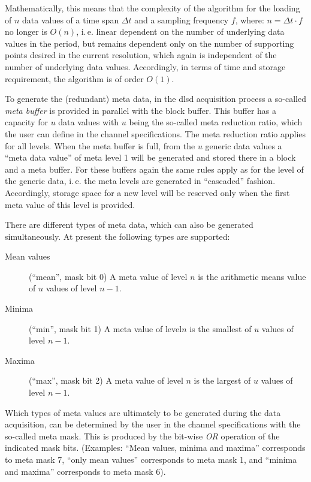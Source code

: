 \documentclass[a4paper,12pt,BCOR6mm,bibtotoc,idxtotoc]{scrbook}
\begin{document}
Mathematically, this means that the complexity of the algorithm for the
loading of $n$ data values of a time span $\Delta t$ and a sampling frequency
$f$, where: $n = \Delta t \cdot f$ no longer is $O(n)$, i.\,e. linear
dependent on the number of underlying data values in the period, but remains
dependent only on the number of supporting points desired in the current
resolution, which again is independent of the number of underlying data
values. Accordingly, in terms of time and storage requirement, the algorithm
is of order $O(1)$.

To generate the (redundant) meta data, in the dlsd acquisition process a
so-called \textit{meta buffer} is provided in parallel with the block buffer.
This buffer has a capacity for $u$ data values with $u$ being the so-called
meta reduction ratio, which the user can define in
the channel specifications. The meta reduction ratio applies for all levels.
When the meta buffer is full, from the $u$ generic data values a ``meta data
value'' of meta level 1 will be generated and stored there in a block and a
meta buffer. For these buffers again the same rules apply as for the level of
the generic data, i.\,e. the meta levels are generated in ``cascaded'' fashion.
Accordingly, storage space for a new level will be reserved only when the
first meta value of this level is provided.

There are different types of meta data, which can also be
generated simultaneously.  At present the following types are supported:

\begin{description}

\item[Mean values] (``mean'', mask bit 0) A meta value of level $n$ is the
arithmetic means value of $u$ values of level $n - 1$.

\item[Minima] (``min'', mask bit 1) A meta value of level$n$ is the smallest
of $u$ values of level $n - 1$.

\item[Maxima] (``max'', mask bit 2) A meta value of level $n$ is the largest
of $u$ values of level $n - 1$.

\end{description}

Which types of meta values are ultimately to be generated during the data
acquisition, can be determined by the user in the channel specifications with
the so-called meta mask. This is produced by the bit-wise
\textit{OR} operation of the indicated mask bits. (Examples: ``Mean values,
minima and maxima'' corresponds to meta mask 7, ``only mean values''
corresponds to meta mask 1, and ``minima and maxima'' corresponds to meta mask
6).
\end{document}
